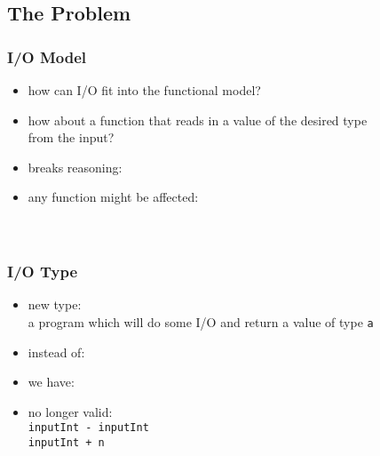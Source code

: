 \documentclass[dvipsnames]{beamer}
\theoremstyle{plain}
\begin{document}
\subsection{The Problem}

\begin{frame}
  \frametitle{I/O Model}

  \begin{itemize}
    \item how can I/O fit into the functional model?

    \bigskip
    \item how about a function that reads in a value of the desired type\\
      from the input?\\
      \smallskip

    \pause
    \medskip
    \item breaks reasoning:\\
      \smallskip
    \item any function might be affected:\\
      \smallskip
      \\
      \\
  \end{itemize}
\end{frame}

\begin{frame}
  \frametitle{I/O Type}

  \begin{itemize}
    \item new type: \\
      a program which will do some I/O and return a value of type \texttt{a}

    \medskip
    \item instead of:\\
      \smallskip
    \item we have:\\
      \smallskip

    \pause
    \medskip
    \item no longer valid:\\
      \texttt{inputInt - inputInt}\\
      \texttt{inputInt + n}
  \end{itemize}
\end{frame}
\end{document}
